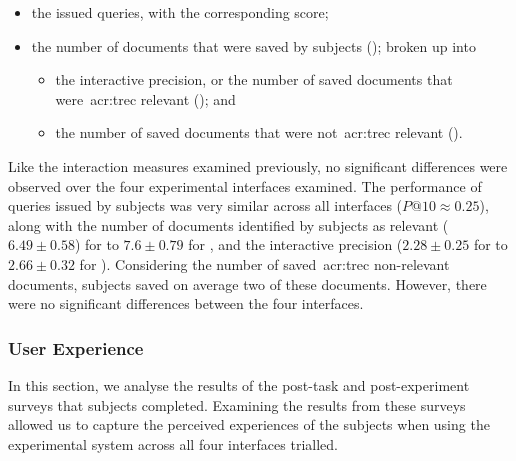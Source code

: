 \begin{itemize}
    \item{the issued queries, with the corresponding  score;}
    \item{the number of documents that were saved by subjects (); broken up into}
    
    \begin{itemize}
        \item{the interactive precision, or the number of saved documents that were~\gls{acr:trec} relevant (); and}
        \item{the number of saved documents that were not~\gls{acr:trec} relevant ().}
    \end{itemize}
\end{itemize}

Like the interaction measures examined previously, no significant differences were observed over the four experimental interfaces examined. The performance of queries issued by subjects was very similar across all interfaces ($P@10 \approx 0.25$), along with the number of documents identified by subjects as relevant ($6.49\pm0.58$) for  to $7.6\pm0.79$ for , and the interactive precision ($2.28\pm0.25$ for  to $2.66\pm0.32$ for ). Considering the number of saved~\gls{acr:trec} non-relevant documents, subjects saved on average two of these documents. However, there were no significant differences between the four interfaces.

\subsubsection{User Experience}\label{chap:snippets:user:results:ux}
In this section, we analyse the results of the post-task and post-experiment surveys that subjects completed. Examining the results from these surveys allowed us to capture the perceived experiences of the subjects when using the experimental system across all four interfaces trialled.

